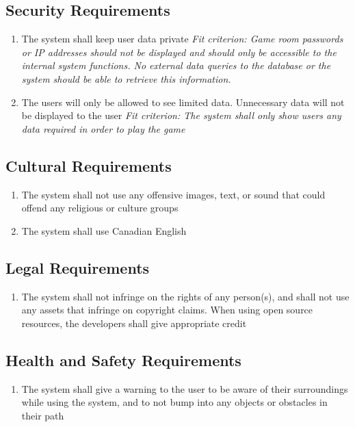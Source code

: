 \documentclass[12pt]{article}
\begin{document}
\subsection{Security Requirements}
\begin{enumerate}[SR\arabic*.]
    \item The system shall keep user data private\newline
    \textit{Fit criterion: Game room passwords or IP addresses should not be displayed and should only be accessible to the internal system functions. No external data queries to the database or the system should be able to retrieve this information.}
    \item The users will only be allowed to see limited data. Unnecessary data will not be displayed to the user\newline
    \textit{Fit criterion: The system shall only show users any data required in order to play the game}
\end{enumerate}
\subsection{Cultural Requirements}
\begin{enumerate}[CR\arabic*]
    \item The system shall not use any offensive images, text, or sound that could offend any religious or culture groups
    \item The system shall use Canadian English
\end{enumerate}
\subsection{Legal Requirements}
\begin{enumerate}[LR\arabic*]
    \item The system shall not infringe on the rights of any person(s), and shall not use any assets that infringe on copyright claims. When using open source resources, the developers shall give appropriate credit
\end{enumerate}
\subsection{Health and Safety Requirements}
\begin{enumerate}[HS\arabic*]
    \item The system shall give a warning to the user to be aware of their surroundings while using the system, and to not bump into any objects or obstacles in their path
\end{enumerate}
\end{document}
